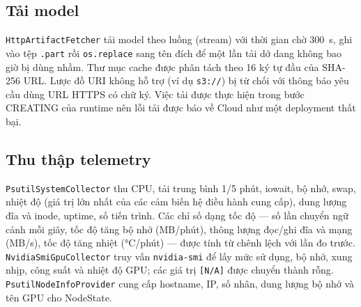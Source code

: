 \subsection{Tải model}

\texttt{HttpArtifactFetcher} tải model theo luồng (stream) với thời gian chờ 300~s,
ghi vào tệp \texttt{.part} rồi \texttt{os.replace} sang tên đích để một lần tải dở
dang không bao giờ bị dùng nhầm. Thư mục cache được phân tách theo 16 ký tự đầu
của SHA-256 URL. Lược đồ URI không hỗ trợ (ví dụ \texttt{s3://}) bị từ chối với
thông báo yêu cầu dùng URL HTTPS có chữ ký. Việc tải được thực hiện trong bước
CREATING của runtime nên lỗi tải được báo về Cloud như một deployment thất bại.

\subsection{Thu thập telemetry}

\texttt{PsutilSystemCollector} thu CPU, tải trung bình 1/5 phút, iowait, bộ nhớ,
swap, nhiệt độ (giá trị lớn nhất của các cảm biến hệ điều hành cung cấp), dung
lượng đĩa và inode, uptime, số tiến trình. Các chỉ số dạng tốc độ --- số lần chuyển
ngữ cảnh mỗi giây, tốc độ tăng bộ nhớ (MB/phút), thông lượng đọc/ghi đĩa và
mạng (MB/s), tốc độ tăng nhiệt (°C/phút) --- được tính từ chênh lệch với lần đo
trước.
\texttt{NvidiaSmiGpuCollector} truy vấn \texttt{nvidia-smi} để lấy mức sử dụng,
bộ nhớ, xung nhịp, công suất và nhiệt độ GPU; các giá trị \texttt{[N/A]} được
chuyển thành rỗng. \texttt{PsutilNodeInfoProvider} cung cấp hostname, IP, số nhân,
dung lượng bộ nhớ và tên GPU cho NodeState.

